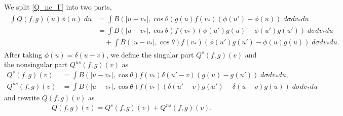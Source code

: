 \documentclass[reqno,10pt]{amsart}
\numberwithin{equation}{section}
\begin{document}
\noindent We split \eqref{Q_nc_I'} into two parts,
\begin{align} \label{split_nc_I}
\begin{split}
     \int Q(f,g)(u)\phi(u) \;du 
    &= \int B(|u-v_*|, \cos\theta)g(u)f(v_*) (\phi(u')-\phi(u)) \;d\sigma dv_* du \\
     &= \int B(|u-v_*|, \cos\theta)f(v_*)(\phi(u')g(u)-\phi(u')g(u'))\; d\sigma dv_*du \\
      &\quad + \int B(|u-v_*|, \cos\theta)f(v_*)(\phi(u')g(u')-\phi(u)g(u))\; d\sigma dv_* du. 
\end{split}
\end{align}
After taking $\phi(u)=\delta(u-v)$, we define the singular part $Q^{s}(f,g)(v)$ and the nonsingular part $ Q^{ns}(f,g)(v)$ as
\begin{align}  
    Q^{s}(f,g)(v) &= \int B(|u-v_*|, \cos\theta)f(v_*)\delta(u'-v)(g(u)-g(u'))\; d\sigma dv_*du, \label{Qs_nc_I} \\
    Q^{ns}(f,g)(v) &= \int B(|u-v_*|, \cos\theta)f(v_*)(\delta(u'-v)g(u')-\delta(u-v)g(u))\; d\sigma dv_* du \label{Qns_nc_I}
\end{align}
and rewrite $Q(f,g)(v)$ as
\begin{align} \label{Qs_Qns_nc_I}
    Q(f,g)(v) = Q^{s}(f,g)(v) + Q^{ns}(f,g)(v).
\end{align} \vspace{3mm}
\end{document}
